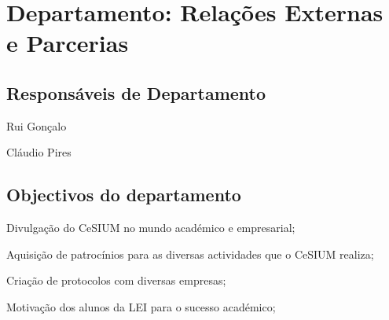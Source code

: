 \section{Departamento: Relações Externas e Parcerias}

\subsection{Responsáveis de Departamento}
\begin{itemizedash}
	\item Rui Gonçalo
	\item Cláudio Pires
\end{itemizedash}

\subsection{Objectivos do departamento}
\lipsum[2]
\begin{itemizedash}
	\item Divulgação do CeSIUM no mundo académico e empresarial;
	\item Aquisição de patrocínios para as diversas actividades que o CeSIUM realiza;
	\item Criação de protocolos com diversas empresas;
	\item Motivação dos alunos da LEI para o sucesso académico;
\end{itemizedash}

